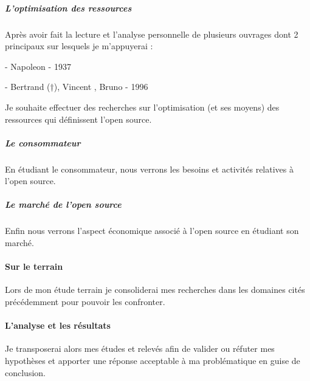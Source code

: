 			\subparagraph{L'optimisation des ressources\\}
		
				Après avoir fait la lecture et l'analyse personnelle de plusieurs ouvrages dont 2 principaux sur lesquels je m'appuyerai : 
		
				\begin{displayquote}
					 - Napoleon  - 1937
				\end{displayquote}
				\begin{displayquote}
					 - Bertrand  (†), Vincent , Bruno \bsc{Jarrosson} - 1996
				\end{displayquote}
		
				Je souhaite effectuer des recherches sur l'optimisation (et ses moyens) des ressources qui définissent l'open source.

			\subparagraph{Le consommateur\\}
				En étudiant le consommateur, nous verrons les besoins et activités relatives à l'open source.

			\subparagraph{Le marché de l'open source\\}
				Enfin nous verrons l'aspect économique associé à l'open source en étudiant son marché.

		\paragraph{Sur le terrain \\}
			Lors de mon étude terrain je consoliderai mes recherches dans les domaines cités précédemment pour pouvoir les confronter.

		\paragraph{L'analyse et les résultats \\}
			Je transposerai alors mes études et relevés afin de valider ou réfuter mes hypothèses et apporter une réponse acceptable à ma problématique en guise de conclusion.